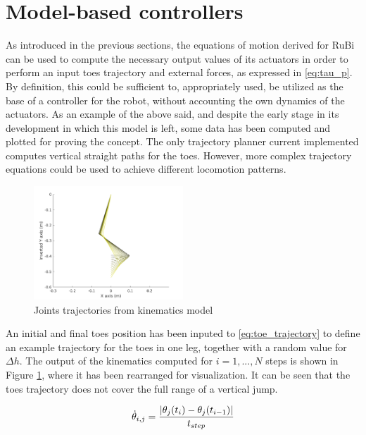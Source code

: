 
\section{Model-based controllers}
\label{sec_dynamic_controller}
As introduced in the previous sections, the equations of motion derived for RuBi can be used to compute the necessary output values of its actuators in order to perform an input toes trajectory and external forces, as expressed in \ref{eq:tau_p}.
By definition, this could be sufficient to, appropriately used, be utilized as the base of a controller for the robot, without accounting the own dynamics of the actuators.
As an example of the above said, and despite the early stage in its development in which this model is left, some data has been computed and plotted for proving the concept.
The only trajectory planner current implemented computes vertical straight paths for the toes.
However, more complex trajectory equations could be used to achieve different locomotion patterns.

\begin{figure}[htb]
	\centering
	\includegraphics[width=0.5\textwidth]{figures/kinematics_sim.pdf}
	\caption{Joints trajectories from kinematics model}
	\label{fig:controller_position}
\end{figure}

An initial and final toes position has been inputed to \ref{eq:toe_trajectory} to define an example trajectory for the toes in one leg, together with a random value for $\Delta h$.
The output of the kinematics computed for $i=1,...,N$ steps is shown in Figure \ref{fig:controller_position}, where it has been rearranged for visualization.
It can be seen that the toes trajectory does not cover the full range of a vertical jump.

\begin{equation}
\label{eq:joint_vel}
	\dot{\theta}_{i,j} =\frac{ \lvert \theta_{j}(t_{i}) - \theta_{j}(t_{i-1}) \rvert }{ t_{step} }
\end{equation}

